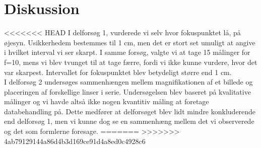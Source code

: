\section{Diskussion}
<<<<<<< HEAD
I delforsøg 1, vurderede vi selv hvor fokuspunktet lå, på øjesyn. Usikkerhedem bestemmes til 1 cm, men det er stort set umuligt at angive i hvilket interval vi ser skarpt. I samme forsøg, valgte vi at tage 15 målinger for f=10, mens vi blev tvunget til at tage færre, fordi vi ikke kunne vurdere, hvor det var skarpest. Intervallet for fokuspunktet blev betydeligt større end 1 cm.
\\ I delforsøg 2 undersøges sammenhængen mellem magnifikationen af et billede og placeringen af forskellige linser i serie. Undersøgelsen blev baseret på kvalitative målinger og vi havde altså ikke nogen kvantitiv måling at foretage databehandling på. Dette medfører at delforsøget blev lidt mindre konkluderende end delforsøg 1, men vi kunne dog se en sammenhæng mellem det vi observerede og det som formlerne foresage.
=======
>>>>>>> 4ab79129144a86d4b3d169ce91d4a8ed0c4928c6
